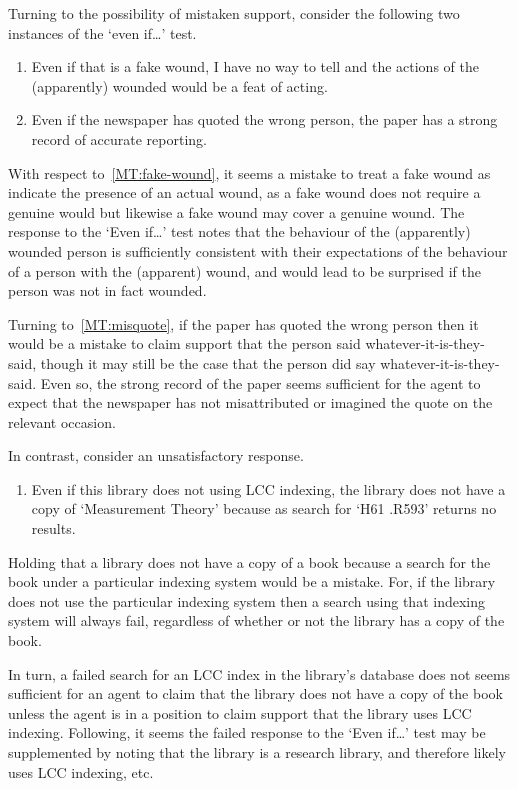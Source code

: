 \begin{note}
  Turning to the possibility of mistaken support, consider the following two instances of the `even if\dots' test.

  \begin{enumerate}[label=(MT\arabic*), ref=(MT\arabic*), series=MT_counter]
  \item\label{MT:fake-wound} Even if that is a fake wound, I have no way to tell and the actions of the (apparently) wounded would be a feat of acting.
  \item\label{MT:misquote} Even if the newspaper has quoted the wrong person, the paper has a strong record of accurate reporting.
  \end{enumerate}

  With respect to~\ref{MT:fake-wound}, it seems a mistake to treat a fake wound as indicate the presence of an actual wound, as a fake wound does not require a genuine would but likewise a fake wound may cover a genuine wound.
  The response to the `Even if\dots' test notes that the behaviour of the (apparently) wounded person is sufficiently consistent with their expectations of the behaviour of a person with the (apparent) wound, and would lead to be surprised if the person was not in fact wounded.

  Turning to~\ref{MT:misquote}, if the paper has quoted the wrong person then it would be a mistake to claim support that the person said whatever-it-is-they-said, though it may still be the case that the person did say whatever-it-is-they-said.
  Even so, the strong record of the paper seems sufficient for the agent to expect that the newspaper has not misattributed or imagined the quote on the relevant occasion.

  In contrast, consider an unsatisfactory response.

  \begin{enumerate}[label=(MT\arabic*), ref=(MT\arabic*), resume*=MT_counter]
  \item Even if this library does not using LCC indexing, the library does not have a copy of `Measurement Theory' because as search for `H61 .R593' returns no results.
  \end{enumerate}
  Holding that a library does not have a copy of a book because a search for the book under a particular indexing system would be a mistake.
  For, if the library does not use the particular indexing system then a search using that indexing system will always fail, regardless of whether or not the library has a copy of the book.

  In turn, a failed search for an LCC index in the library's database does not seems sufficient for an agent to claim that the library does not have a copy of the book unless the agent is in a position to claim support that the library uses LCC indexing.
  Following, it seems the failed response to the `Even if\dots' test may be supplemented by noting that the library is a research library, and therefore likely uses LCC indexing, etc.\
\end{note}


